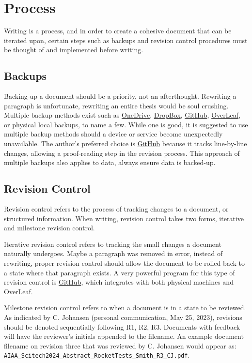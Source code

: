 \section{Process}

Writing is a process, and in order to create a cohesive document that can be iterated upon, certain steps such as backups and revision control procedures must be thought of and implemented before writing. 

\subsection{Backups}
Backing-up a document should be a priority, not an afterthought. 
Rewriting a paragraph is unfortunate, rewriting an entire thesis would be soul crushing. 
Multiple backup methods exist such as \href{https://onedrive.live.com/login/}{OneDrive}, \href{https://www.dropbox.com}{DropBox}, \href{https://github.com/}{GitHub}, \href{https://www.overleaf.com/}{OverLeaf}, or physical local backups, to name a few. 
While one is good, it is suggested to use multiple backup methods should a device or service become unexpectedly unavailable. 
The author's preferred choice is \href{https://github.com/}{GitHub} because it tracks line-by-line changes, allowing a proof-reading step in the revision process. 
This approach of multiple backups also applies to data, always ensure data is backed-up. 


\subsection{Revision Control}
Revision control refers to the process of tracking changes to a document, or structured information. 
When writing, revision control takes two forms, iterative and milestone revision control. 

Iterative revision control refers to tracking the small changes a document naturally undergoes. 
Maybe a paragraph was removed in error, instead of rewriting, proper revision control should allow the document to be rolled back to a state where that paragraph exists.
A very powerful program for this type of revision control is \href{https://github.com/}{GitHub}, which integrates with both physical machines and \href{https://www.overleaf.com/}{OverLeaf}.

Milestone revision control refers to when a document is in a state to be reviewed. 
As indicated by C. Johansen (personal communication, May 25, 2023), revisions should be denoted sequentially following R1, R2, R3. Documents with feedback will have the reviewer's initials appended to the filename. An example document filename on revision three that was reviewed by C. Johansen would appear as: \verb*|AIAA_Scitech2024_Abstract_RocketTests_Smith_R3_CJ.pdf|.